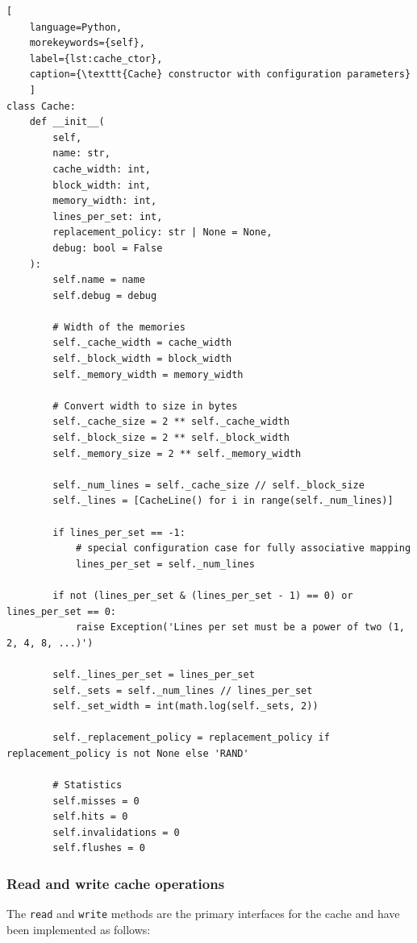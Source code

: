 \begin{center}
\centering
\begin{minipage}{\linewidth}
\begin{lstlisting}[
    language=Python,
	morekeywords={self},
    label={lst:cache_ctor},
    caption={\texttt{Cache} constructor with configuration parameters}
    ]
class Cache:
    def __init__(
        self,
        name: str,
        cache_width: int,
        block_width: int,
        memory_width: int,
        lines_per_set: int,
        replacement_policy: str | None = None,
        debug: bool = False
    ):
        self.name = name
        self.debug = debug

        # Width of the memories
        self._cache_width = cache_width
        self._block_width = block_width
        self._memory_width = memory_width

        # Convert width to size in bytes
        self._cache_size = 2 ** self._cache_width
        self._block_size = 2 ** self._block_width
        self._memory_size = 2 ** self._memory_width

        self._num_lines = self._cache_size // self._block_size
        self._lines = [CacheLine() for i in range(self._num_lines)]

        if lines_per_set == -1:
            # special configuration case for fully associative mapping
            lines_per_set = self._num_lines

        if not (lines_per_set & (lines_per_set - 1) == 0) or lines_per_set == 0:
            raise Exception('Lines per set must be a power of two (1, 2, 4, 8, ...)')

        self._lines_per_set = lines_per_set
        self._sets = self._num_lines // lines_per_set
        self._set_width = int(math.log(self._sets, 2))

        self._replacement_policy = replacement_policy if replacement_policy is not None else 'RAND'

        # Statistics
        self.misses = 0
        self.hits = 0
        self.invalidations = 0
        self.flushes = 0
\end{lstlisting}
\end{minipage}
\end{center}

\subsubsection*{Read and write cache operations}
\noindent The \texttt{read} and \texttt{write} methods are the primary interfaces for the cache and have been implemented as follows:

